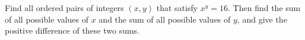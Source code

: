 Find all ordered pairs of integers $(x,y)$ that satisfy $x^y=16$. Then find the sum of all possible values of $x$ and the sum of all possible values of $y$, and give the positive difference of these two sums.
